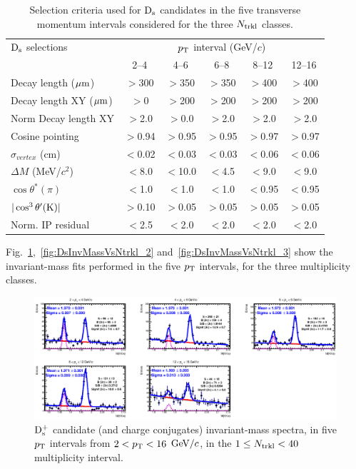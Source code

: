 \begin{table}[h!]
\centering
\begin{tabular}{|l|c|c|c|c|c|}
\hline
${\rm D_s}$ selections & \multicolumn{5}{c|}{$p_{\rm T}$ interval (GeV/$c$)}\\
\cline{2-6}
  & 2--4  & 4--6 & 6--8 & 8--12 & 12--16\\
\hline
Decay length ($\mathrm{\mu m}$)        & $>$300 & $>$350 & $>$350 & $>$400& $>$400\\
Decay length XY ($\mathrm{\mu m}$)     & $>$0 & $>$200 & $>$200 & $>$200 & $>$200\\
Norm Decay length XY          & $>$2.0& $>$0.0 & $>$2.0 & $>$2.0 & $>$2.0\\
Cosine pointing              & $>$0.94 & $>$0.95 & $>$0.95 & $>$0.97 & $>$0.97\\
$\sigma_{vertex}$  (cm)          & $<$0.02 & $<$0.03 & $<$0.03 & $<$0.06 & $<$0.06\\
$\Delta M$ (MeV/$c^{2}$) & $<$8.0 & $<$10.0 & $<$4.5 & $<$9.0 & $<$9.0\\
$\cos \theta^*(\pi)$    & $<$1.0 & $<$1.0 & $<$1.0 & $<$0.95 & $<$0.95\\
$|\cos^3 \theta^\prime({\rm K})|$        & $>$0.10 & $>$0.05 & $>$0.05 & $>$0.05 & $>$0.05\\
Norm. IP residual  & $<$2.5 & $<$2.0 & $<$2.0 & $<$2.0  & $<$2.0 \\
\hline
\end{tabular}
\caption{Selection criteria used for ${\rm D_s}$ candidates in the five transverse momentum intervals considered for the three $N_{\rm trkl}$ classes.}
\label{tab:cutsDsVsNtrkl}
\end{table}
Fig.~\ref{fig:DsInvMassVsNtrkl_1},~\ref{fig:DsInvMassVsNtrkl_2} and~\ref{fig:DsInvMassVsNtrkl_3} 
show the invariant-mass fits performed in the five $p_{\rm T}$ intervals, for the three 
multiplicity classes. 
\begin{figure}[htpb]
\centering
 \includegraphics[width=1\textwidth]{FigCap6/DsMass_140Trkl.eps}
  \caption{${\rm D_s^+}$ candidate (and charge conjugates) invariant-mass spectra, in five $p_{\rm T}$ intervals from $2 < p_{\rm T} < 16$ $\mathrm{GeV}/c$, in the $1 \leq N_{\rm trkl} < 40$ multiplicity interval.}
 \label{fig:DsInvMassVsNtrkl_1}
\end{figure}

